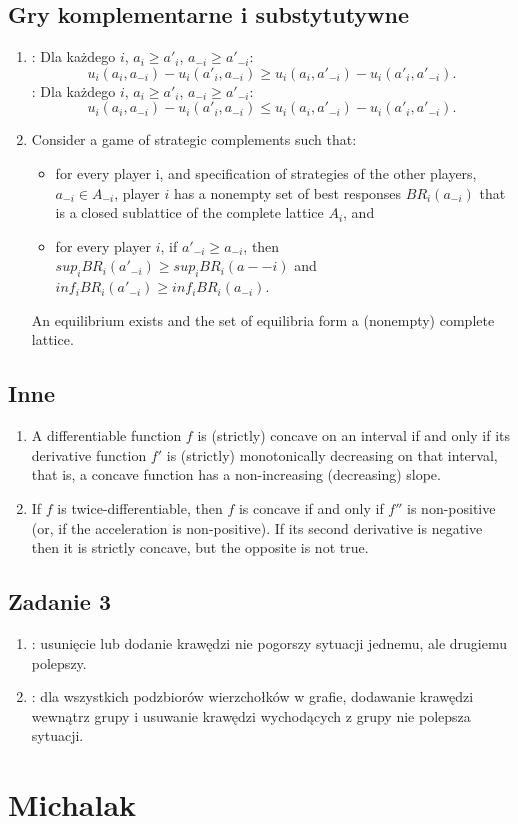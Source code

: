 \documentclass{article}
\newcommand\wassterm[1]{{\color{blue}{#1}}}
\begin{document}
\subsection{Gry komplementarne i substytutywne}
\begin{enumerate}
 \item 
 	\wassterm{Komplementarność}: Dla każdego $i$, $a_i \geq a'_i$, $a_{-i} \geq a'_{-i} $:
 	$$u_i(a_i, a_{-i}) - u_i(a'_i, a_{-i}) \geq  u_i(a_i, a'_{-i}) - u_i(a'_i, a'_{-i}).$$
 	\wassterm{Substytutywność}: Dla każdego $i$, $a_i \geq a'_i$, $a_{-i} \geq a'_{-i} $:
 	$$u_i(a_i, a_{-i}) - u_i(a'_i, a_{-i}) \leq  u_i(a_i, a'_{-i}) - u_i(a'_i, a'_{-i}).$$
 \item Consider a game of strategic complements such that:
  \begin{itemize}
   \item for every player i, and specification of strategies of the other players, $a_{-i} \in A_{-i}$, player $i$ has a
nonempty set of best responses $BR_i(a_{-i})$ that is a closed sublattice of the complete lattice $A_i$, and
   \item for every player $i$, if $a'_{-i} \geq a_{-i}$, then $sup_{i} BR_{i}(a'_{-i}) \geq sup_{i} BR_{i}(a-{-i})$ and $inf_i BR_i(a'_{-i}) \geq inf_i BR_i(a_{-i})$.
  \end{itemize}
  An equilibrium exists and the set of equilibria form a (nonempty) complete lattice.
\end{enumerate}

\subsection{Inne}
\begin{enumerate}
 \item  A differentiable function $f$ is (strictly) concave on an interval if and only if its derivative function $f'$ is (strictly) monotonically decreasing on that interval, that is, a concave function has a non-increasing (decreasing) slope.
 \item If $f$ is twice-differentiable, then $f$ is concave if and only if $f''$ is non-positive (or, if the acceleration is non-positive). If its second derivative is negative then it is strictly concave, but the opposite is not true.
\end{enumerate}

\subsection{Zadanie 3}
\begin{enumerate}
 \item
     \wassterm{pairwise stable}: usunięcie lub dodanie krawędzi nie pogorszy
        sytuacji jednemu, ale drugiemu polepszy.
 \item
     \wassterm{strongly stable}: dla wszystkich podzbiorów wierzchołków w
        grafie, dodawanie krawędzi wewnątrz grupy i usuwanie krawędzi
        wychodących z grupy nie polepsza sytuacji.
\end{enumerate}

\section{Michalak}
\end{document}
